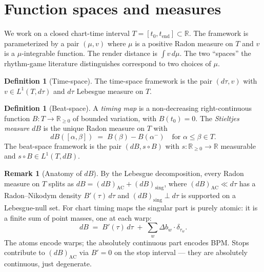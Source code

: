 \documentclass[11pt]{article}
\theoremstyle{definition}
\newtheorem{definition}[theorem]{Definition}
\newtheorem{remark}[theorem]{Remark}
\newcommand{\R}{\mathbb{R}}
\newcommand{\Rnn}{\R_{\geq 0}}
\newcommand{\dtau}{\,d\tau}
\newcommand{\dmu}{\,d\mu}
\newcommand{\Lone}{L^{1}}
\newcommand{\AC}{\mathrm{AC}}
\begin{document}
\tableofcontents

\section{Function spaces and measures}
\label{sec:spaces}

We work on a closed chart-time interval $T = [t_0, t_{\mathrm{end}}] \subset \R$.
The framework is parameterized by a pair $(\mu, v)$ where $\mu$ is a positive
Radon measure on $T$ and $v$ is a $\mu$-integrable function. The render distance
is $\int v\dmu$. The two ``spaces'' the rhythm-game literature distinguishes
correspond to two choices of $\mu$.

\begin{definition}[Time-space]
\label{def:time-space}
The time-space framework is the pair $(d\tau, v)$ with $v \in \Lone(T, d\tau)$
and $d\tau$ Lebesgue measure on $T$.
\end{definition}

\begin{definition}[Beat-space]
\label{def:beat-space}
A \emph{timing map} is a non-decreasing right-continuous function
$B : T \to \Rnn$ of bounded variation, with $B(t_0) = 0$. The
\emph{Stieltjes measure} $dB$ is the unique Radon measure on $T$ with
\[
dB([\alpha, \beta]) \;=\; B(\beta) - B(\alpha^-)
\quad \text{for } \alpha \leq \beta \in T.
\]
The beat-space framework is the pair $(dB, s \circ B)$ with
$s : \Rnn \to \R$ measurable and $s \circ B \in \Lone(T, dB)$.
\end{definition}

\begin{remark}[Anatomy of $dB$]
\label{rem:dB-anatomy}
By the Lebesgue decomposition, every Radon measure on $T$ splits as
$dB = (dB)_{\AC} + (dB)_{\mathrm{sing}}$, where $(dB)_{\AC} \ll d\tau$ has a
Radon--Nikodym density $B'(\tau) \dtau$ and $(dB)_{\mathrm{sing}} \perp d\tau$
is supported on a Lebesgue-null set. For chart timing maps the singular part is
purely atomic: it is a finite sum of point masses, one at each warp:
\begin{equation}
\label{eq:dB-decomp}
dB \;=\; B'(\tau)\dtau \;+\; \sum_{w} \Delta b_w \cdot \delta_{\tau_w}.
\end{equation}
The atoms encode warps; the absolutely continuous part encodes BPM. Stops
contribute to $(dB)_{\AC}$ via $B' = 0$ on the stop interval --- they are
absolutely continuous, just degenerate.
\end{remark}
\end{document}
